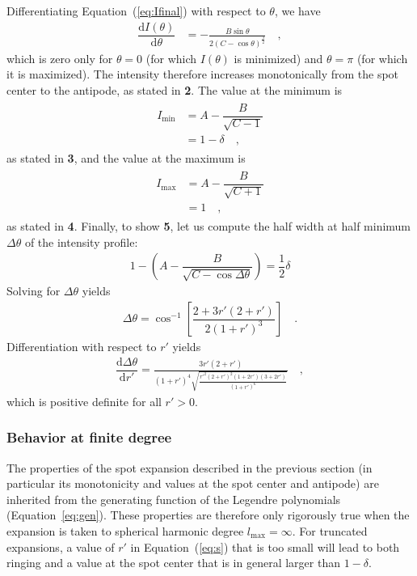 \documentclass[modern]{aastex62}
\begin{document}
Differentiating Equation~(\ref{eq:Ifinal}) with respect to $\theta$, we have
%
\begin{align}
    \label{eq:Ideriv}
    \dfrac{\mathrm{d}I(\theta)}{\mathrm{d}\theta} & =
    -\frac{B\sin\theta}{2(C - \cos\theta)^\frac{3}{2}}
    \quad,
\end{align}
%
which is zero only for $\theta = 0$ (for which $I(\theta)$ is
minimized) and $\theta = \pi$ (for which it is maximized). The intensity
therefore increases monotonically from the spot center to the antipode,
as stated in \textbf{2}. The value at the minimum is
%
\begin{align}
    \begin{split}
        I_{\mathrm{min}} & = A - \dfrac{B}{\sqrt{C - 1}} \\
        & = 1 - \delta
        \quad,
    \end{split}
\end{align}
%
as stated in \textbf{3}, and the value at the maximum is
%
\begin{align}
    \begin{split}
        I_{\mathrm{max}} & = A - \dfrac{B}{\sqrt{C + 1}} \\
        & = 1
        \quad,
    \end{split}
\end{align}
%
as stated in \textbf{4}.
Finally, to show \textbf{5}, let us compute the half width at half minimum
$\Delta\theta$ of the intensity profile:
%
\begin{align}
    1 - \left(A - \dfrac{B}{\sqrt{C - \cos{\Delta\theta}}}\right) =
    \dfrac{1}{2}\delta
\end{align}
%
Solving for $\Delta\theta$ yields
%
\begin{align}
    \label{eq:hwhm}
    \Delta\theta =
    \cos^{-1} \left[ \dfrac{2 + 3 r' (2 + r')}{2 (1 + r')^3} \right]
    \quad.
\end{align}
%
Differentiation with respect to $r'$ yields
%
\begin{align}
    \dfrac{\mathrm{d}\Delta\theta}{\mathrm{d}r'} =
    \frac{3 r' \left(2 + r'\right)}{\left(1 + r'\right)^4
        \sqrt{\frac{r'^2 \left(2 + r'\right)^2 \left(1 + 2 r'\right)
                \left(3 + 2 r'\right)}{\left(1 + r'\right)^6}}}
    \quad,
\end{align}
%
which is positive definite for all $r' > 0$.

\subsubsection{Behavior at finite degree}
%
The properties of the spot expansion described in the previous section
(in particular its monotonicity and values at the spot center and antipode)
are inherited from the generating function of the Legendre polynomials
(Equation~\ref{eq:gen}). These properties are therefore only rigorously
true when the expansion is taken to spherical
harmonic degree $l_{\mathrm{max}} = \infty$. For truncated expansions,
a value of $r'$ in Equation~(\ref{eq:s}) that is too small will lead
to both ringing and a value at the spot center that is in general larger
than $1 - \delta$.
\end{document}
